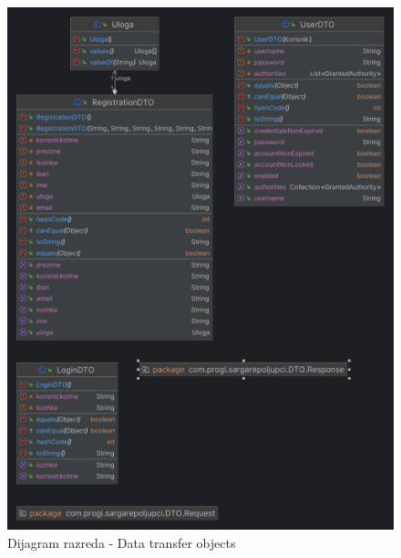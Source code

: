 \begin{figure}[H]
	\includegraphics[width=\textwidth]{slike/dto.png} %
	\centering
	\caption{Dijagram razreda - Data transfer objects}
	\label{fig:dijagramrazreda2}
\end{figure}

